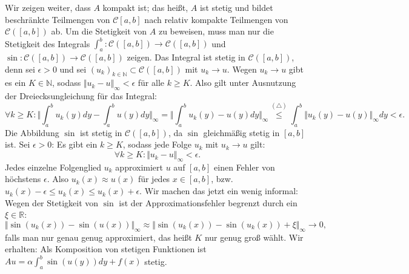 \documentclass[a4paper]{article}
\theoremstyle{plain}
\begin{document}
Wir zeigen weiter, dass $A$ kompakt ist; das heißt, $A$ ist stetig und bildet beschränkte Teilmengen von $\mathcal C[a,b]$ nach relativ kompakte Teilmengen von $\mathcal C([a,b])$ ab. Um die Stetigkeit von $A$ zu beweisen, muss man nur die Stetigkeit des Integrals $\int^b_a: \mathcal C([a,b]) \to \mathcal C([a,b])$ und $\sin: \mathcal C([a,b]) \to \mathcal C([a,b])$ zeigen. Das Integral ist stetig in $\mathcal C([a,b])$, denn sei $\epsilon > 0$ und sei $(u_k)_{k \in \mathbb N} \subset \mathcal C([a,b])$ mit $u_k \to u$. Wegen $u_k \to u$ gibt es ein $K \in \mathbb N$, sodass $\Vert u_k - u \Vert_{\infty} < \epsilon$ für alle $k \geq K$. Also gilt unter Ausnutzung der Dreiecksungleichung für das Integral:
\[
	\forall k \geq K: \Vert \int^b_a u_k(y)dy - \int^b_a u(y) dy \Vert_{\infty} = \Vert \int^b_a u_k(y) - u(y) dy \Vert_{\infty} \overset{(\triangle)}{\leq} \int^b_a \Vert u_k(y)-u(y) \Vert_{\infty} dy < \epsilon.
\]
Die Abbildung $\sin$ ist stetig in $ \mathcal C([a,b])$, da $\sin$ gleichmäßig stetig in $[a,b]$ ist. Sei $\epsilon > 0$: Es gibt ein $k \geq K$, sodass jede Folge $u_k$ mit $u_k \to u$ gilt:
\[
	\forall k \geq K: \Vert u_k - u \Vert_{\infty} < \epsilon.
\]
Jedes einzelne Folgenglied $u_k$ approximiert $u$ auf $[a,b]$ einen Fehler von höchstens $\epsilon$. Also $u_k(x) \approx u(x)$ für jedes $x \in [a,b]$, bzw. $u_k(x) - \epsilon \leq u_k(x) \leq u_k(x) + \epsilon$. Wir machen das jetzt ein wenig informal: Wegen der Stetigkeit von $\sin$ ist der Approximationsfehler begrenzt durch ein $\xi \in \mathbb R$:
\[
	\Vert \sin(u_k(x)) - \sin(u(x)) \Vert_{\infty}  \approx \Vert \sin(u_k(x)) - \sin(u_k(x)) + \xi \Vert_{\infty} \to 0,
\]
falls man nur genau genug approximiert, das heißt $K$ nur genug groß wählt. Wir erhalten: Als Komposition von stetigen Funktionen ist $Au =  \alpha \int^b_a\sin(u(y))dy + f(x)$ stetig. \\
\end{document}
